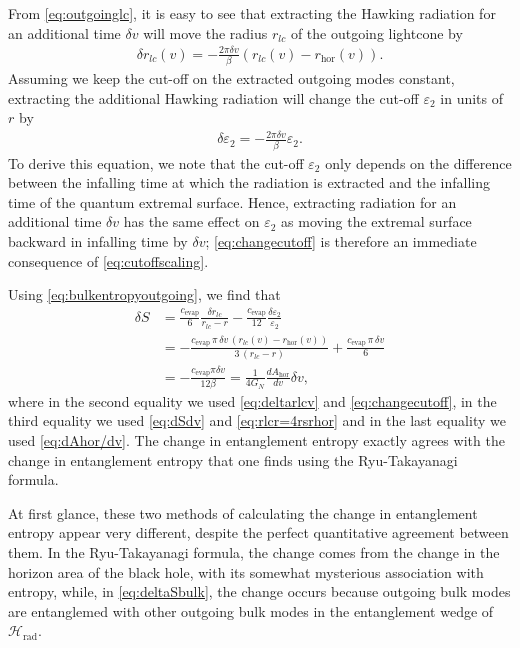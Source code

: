 \documentclass[12pt]{article}
\begin{document}
From \eqref{eq:outgoinglc}, it is easy to see that extracting the Hawking radiation for an additional time $\delta v$ will move the radius $r_{lc}$ of the outgoing lightcone by
\begin{align} \label{eq:deltarlcv}
\delta r_{lc}(v) = - \frac{2 \pi \delta v}{\beta} (r_{lc}(v) - r_\text{hor}(v)).
\end{align}
Assuming we keep the cut-off on the extracted outgoing modes constant, extracting the additional Hawking radiation will change the cut-off $\varepsilon_2$ in units of $r$ by
\begin{align} \label{eq:changecutoff}
\delta \varepsilon_2 = -\frac{2 \pi \delta v}{\beta} \varepsilon_2.
\end{align}
To derive this equation, we note that the cut-off $\varepsilon_2$ only depends on the difference between the infalling time at which the radiation is extracted and the infalling time of the quantum extremal surface. Hence, extracting radiation for an additional time $\delta v$ has the same effect on $\varepsilon_2$ as moving the extremal surface backward in infalling time by $\delta v$; \eqref{eq:changecutoff} is therefore an immediate consequence of \eqref{eq:cutoffscaling}.

Using \eqref{eq:bulkentropyoutgoing}, we find that
\begin{align} \label{eq:deltaSbulk}
\delta S &= \frac{c_\text{evap}}{6} \frac{\delta r_{lc}}{r_{lc} - r} - \frac{c_\text{evap}}{12}\frac{\delta \varepsilon_2}{\varepsilon_2}
\\& = -\frac{c_\text{evap}\, \pi\, \delta v\, (r_{lc}(v) - r_\text{hor}(v))}{3\,(r_{lc} - r)} + \frac{c_\text{evap}\, \pi\, \delta v}{6}
\\& = -\frac{c_\text{evap} \pi \delta v}{12 \beta} = \frac{1}{4 G_N}\frac{d A_\text{hor}}{dv} \delta v,
\end{align}
where in the second equality we used \eqref{eq:deltarlcv} and \eqref{eq:changecutoff}, in the third equality we used \eqref{eq:dSdv} and  \eqref{eq:rlcr=4rsrhor} and in the last equality we used \eqref{eq:dAhor/dv}. The change in entanglement entropy exactly agrees with the change in entanglement entropy that one finds using the Ryu-Takayanagi formula. 

At first glance, these two methods of calculating the change in entanglement entropy appear very different, despite the perfect quantitative agreement between them. In the Ryu-Takayanagi formula, the change comes from the change in the horizon area of the black hole, with its somewhat mysterious association with entropy, while, in \eqref{eq:deltaSbulk}, the change occurs because outgoing bulk modes are entanglemed with other outgoing bulk modes in the entanglement wedge of $\mathcal{H}_\text{rad}$. 
\end{document}
